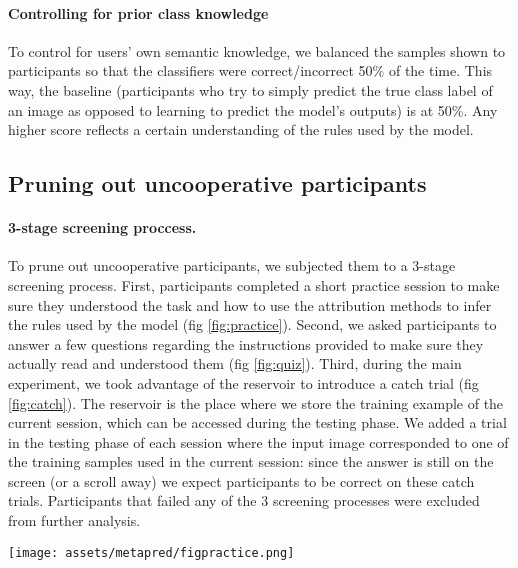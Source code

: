 \paragraph{Controlling for prior class knowledge}

To control for users' own semantic knowledge, we balanced the samples shown to participants so that the classifiers were correct/incorrect 50\% of the time. This way, the baseline (participants who try to simply predict the true class label of an image as opposed to learning to predict the model's outputs) is at 50\%. Any higher score reflects a certain understanding of the rules used by the model.


\subsection{Pruning out uncooperative participants}

\paragraph{3-stage screening proccess.}

To prune out uncooperative participants, we subjected them to a 3-stage screening process. First, participants completed a short practice session to make sure they understood the task and how to use the attribution methods to infer the rules used by the model (fig \ref{fig:practice}). 
Second, we asked participants to answer a few questions regarding the instructions provided to make sure they actually read and understood them (fig \ref{fig:quiz}). 
Third, during the main experiment, we took advantage of the reservoir to introduce a catch trial (fig \ref{fig:catch}). The reservoir is the place where we store the training example of the current session, which can be accessed during the testing phase. We added a trial in the testing phase of each session where the input image corresponded to one of the training samples used in the current session: since the answer is still on the screen (or a scroll away) we expect participants to be correct on these catch trials. Participants that failed any of the 3 screening processes were excluded from further analysis. 


\begin{figure*}
    \centering
    \texttt{[image: assets/metapred/figpractice.png]}
    \caption{\textbf{Practice session.} Through a practice session, which is a simplified version of the main experiment, we evaluate if users understand how to read and use explanations. Participants that failed to predict correctly any of the 5 cat test images on the first try were excluded from further analysis.}
    \label{fig:practice}
\end{figure*}

